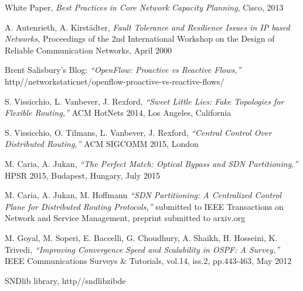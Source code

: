 \documentclass[10pt, conference]{IEEEtran}
\begin{document}
\begin{thebibliography}{1}
 White Paper, \emph{Best Practices in Core Network Capacity Planning}, Cisco, 2013

 A. Autenrieth, A. Kirst\"{a}dter, \emph{Fault Tolerance and Resilience Issues in IP based Networks,} Proceedings of the 2nd International Workshop on the Design of Reliable Communication Networks, April 2000

 Brent Salisbury's Blog: \emph{``OpenFlow: Proactive vs Reactive Flows,''} http//networkstaticnet/openflow-proactive-vs-reactive-flows/

 S. Vissicchio, L. Vanbever, J. Rexford, \emph{``Sweet Little Lies: Fake Topologies for Flexible Routing,''} ACM HotNets 2014, Los Angeles, California

 S. Vissicchio, O. Tilmans, L. Vanbever, J. Rexford, \emph{``Central Control Over Distributed Routing,''} ACM SIGCOMM 2015, London

 M. Caria, A. Jukan, \emph{``The Perfect Match: Optical Bypass and SDN Partitioning,''} HPSR 2015, Budapest, Hungary, July 2015

 M. Caria, A. Jukan,  M. Hoffmann \emph{``SDN Partitioning: A Centralized Control Plane for Distributed Routing Protocols,''} submitted to IEEE Transactions on Network and Service Management, preprint submitted to arxiv.org

 M. Goyal, M. Soperi, E. Baccelli, G. Choudhury, A. Shaikh, H. Hosseini, K. Trivedi, \emph{``Improving Convergence Speed and Scalability in OSPF: A Survey,''} IEEE Communications Surveys \& Tutorials, vol.14, iss.2, pp.443-463, May 2012

 SNDlib library, http//sndlibzibde

\end{thebibliography}
\end{document}
